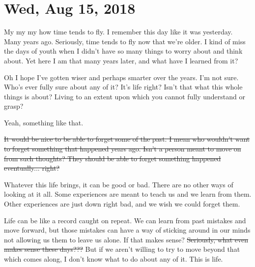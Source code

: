 \section{Wed, Aug 15, 2018}

My my my how time tends to fly. I remember this day like it was yesterday. Many years
ago. Seriously, time tends to fly now that we're older. I kind of miss the days of
youth when I didn't have so many things to worry about and think about. Yet here I am
that many years later, and what have I learned from it?

Oh I hope I've gotten wiser and perhaps smarter over the years. I'm not sure. Who's
ever fully sure about any of it? It's life right? Isn't that what this whole things
is about? Living to an extent upon which you cannot fully understand or grasp?

Yeah, something like that.

\st{It would be nice to be able to forget some of the past. I mean who wouldn't want 
to forget something that happened years ago. Isn't a person meant to move on from
such thoughts? They should be able to forget something happened eventually... right?}

Whatever this life brings, it can be good or bad. There are no other ways of looking
at it all. Some experiences are meant to teach us and we learn from them. Other
experiences are just down right bad, and we wish we could forget them.

Life can be like a record caught on repeat. We can learn from past mistakes and move
forward, but those mistakes can have a way of sticking around in our minds not
allowing us them to leave us alone. If that makes sense? \st{Seriously, what even 
makes sense these days???} But if we aren't willing to try to move beyond that which
comes along, I don't know what to do about any of it. This is life.